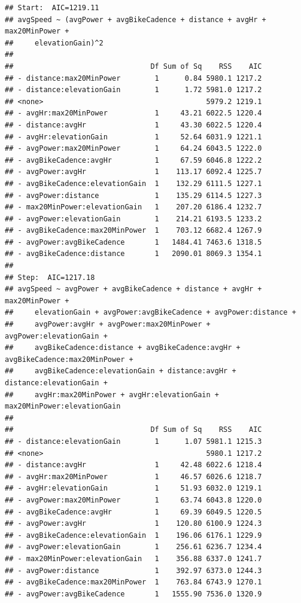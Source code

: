 \documentclass[
]{book}
\begin{document}
\begin{verbatim}
## Start:  AIC=1219.11
## avgSpeed ~ (avgPower + avgBikeCadence + distance + avgHr + max20MinPower + 
##     elevationGain)^2
## 
##                                Df Sum of Sq    RSS    AIC
## - distance:max20MinPower        1      0.84 5980.1 1217.2
## - distance:elevationGain        1      1.72 5981.0 1217.2
## <none>                                      5979.2 1219.1
## - avgHr:max20MinPower           1     43.21 6022.5 1220.4
## - distance:avgHr                1     43.30 6022.5 1220.4
## - avgHr:elevationGain           1     52.64 6031.9 1221.1
## - avgPower:max20MinPower        1     64.24 6043.5 1222.0
## - avgBikeCadence:avgHr          1     67.59 6046.8 1222.2
## - avgPower:avgHr                1    113.17 6092.4 1225.7
## - avgBikeCadence:elevationGain  1    132.29 6111.5 1227.1
## - avgPower:distance             1    135.29 6114.5 1227.3
## - max20MinPower:elevationGain   1    207.20 6186.4 1232.7
## - avgPower:elevationGain        1    214.21 6193.5 1233.2
## - avgBikeCadence:max20MinPower  1    703.12 6682.4 1267.9
## - avgPower:avgBikeCadence       1   1484.41 7463.6 1318.5
## - avgBikeCadence:distance       1   2090.01 8069.3 1354.1
## 
## Step:  AIC=1217.18
## avgSpeed ~ avgPower + avgBikeCadence + distance + avgHr + max20MinPower + 
##     elevationGain + avgPower:avgBikeCadence + avgPower:distance + 
##     avgPower:avgHr + avgPower:max20MinPower + avgPower:elevationGain + 
##     avgBikeCadence:distance + avgBikeCadence:avgHr + avgBikeCadence:max20MinPower + 
##     avgBikeCadence:elevationGain + distance:avgHr + distance:elevationGain + 
##     avgHr:max20MinPower + avgHr:elevationGain + max20MinPower:elevationGain
## 
##                                Df Sum of Sq    RSS    AIC
## - distance:elevationGain        1      1.07 5981.1 1215.3
## <none>                                      5980.1 1217.2
## - distance:avgHr                1     42.48 6022.6 1218.4
## - avgHr:max20MinPower           1     46.57 6026.6 1218.7
## - avgHr:elevationGain           1     51.93 6032.0 1219.1
## - avgPower:max20MinPower        1     63.74 6043.8 1220.0
## - avgBikeCadence:avgHr          1     69.39 6049.5 1220.5
## - avgPower:avgHr                1    120.80 6100.9 1224.3
## - avgBikeCadence:elevationGain  1    196.06 6176.1 1229.9
## - avgPower:elevationGain        1    256.61 6236.7 1234.4
## - max20MinPower:elevationGain   1    356.88 6337.0 1241.7
## - avgPower:distance             1    392.97 6373.0 1244.3
## - avgBikeCadence:max20MinPower  1    763.84 6743.9 1270.1
## - avgPower:avgBikeCadence       1   1555.90 7536.0 1320.9

\end{verbatim}
\end{document}
